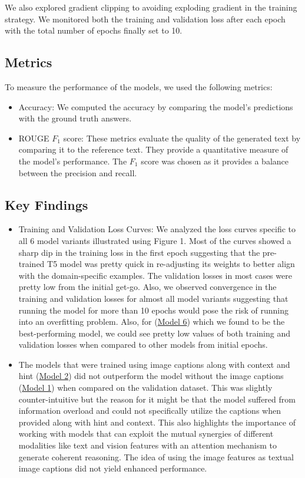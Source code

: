 \documentclass[10pt,twocolumn,letterpaper]{article}
\begin{document}
We also explored gradient clipping to avoiding exploding gradient in the training strategy. We monitored both the training and validation loss after each epoch with the total number of epochs finally set to 10.
\subsection{Metrics}

To measure the performance of the models, we used the following metrics:
\begin{itemize}
    \item Accuracy: We computed the accuracy by comparing the model's predictions with the ground truth answers.
    \item ROUGE $F_{1}$ score: These metrics evaluate the quality of the generated text by comparing it to the reference text. They provide a quantitative measure of the model's performance. The $F_{1}$ score was chosen as it provides a balance between the precision and recall.
\end{itemize}

\subsection{Key Findings}

\begin{itemize}
    \item Training and Validation Loss Curves: We analyzed the loss curves specific to all 6 model variants illustrated using Figure 1. Most of the curves showed a sharp dip in the training loss in the first epoch suggesting that the pre-trained T5 model was pretty quick in re-adjusting its weights to better align with the domain-specific examples. The validation losses in most cases were pretty low from the initial get-go. Also, we observed convergence in the training and validation losses for almost all model variants suggesting that running the model for more than 10 epochs would pose the risk of running into an overfitting problem. Also, for (\hyperref[sec:model6]{Model 6}) which we found to be the best-performing model, we could see pretty low values of both training and validation losses when compared to other models from initial epochs.

    
    \item The models that were trained using image captions along with context and hint (\hyperref[sec:model2]{Model 2}) did not outperform the model without the image captions (\hyperref[sec:model1]{Model 1}) when compared on the validation dataset. This was slightly counter-intuitive but the reason for it might be that the model suffered from information overload and could not specifically utilize the captions when provided along with hint and context. This also highlights the importance of working with models that can exploit the mutual synergies of different modalities like text and vision features with an attention mechanism to generate coherent reasoning. The idea of using the image features as textual image captions did not yield enhanced performance. 
\end{itemize}
\end{document}
